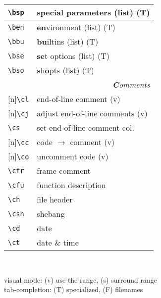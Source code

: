 \documentclass[oneside,11pt,landscape,DIV16]{scrartcl}
\newcommand{\Rep}{{\scriptsize{[n]}}}
\begin{document}
\begin{multicols}{3}
\begin{center}
\begin{tabular}[]{|p{11mm}|p{60mm}|}
\hline \verb'\bsp'   & \textbf{s}pecial \textbf{p}arameters (list)     \hfill (T)\\
\hline \verb'\ben'   & \textbf{en}vironment (list)                     \hfill (T)\\
\hline \verb'\bbu'   & \textbf{bu}iltins (list)                        \hfill (T)\\
\hline \verb'\bse'   & \textbf{se}t options (list)                     \hfill (T)\\
\hline \verb'\bso'   & \textbf{s}h\textbf{o}pts (list)                 \hfill (T)\\
\hline 
\hline
\multicolumn{2}{|r|}{\textsl{\textbf{C}omments}}                       \\[1.0ex]
\hline \Rep\verb'\cl'   & end-of-line comment               \hfill (v)\\
\hline \Rep\verb'\cj'   & adjust end-of-line comments       \hfill (v)\\
\hline     \verb'\cs'   & set end-of-line comment col.      \\
%
\hline \Rep\verb'\cc'   & code $\rightarrow$ comment        \hfill (v)\\
\hline \Rep\verb'\co'   & uncomment code                    \hfill (v)\\
%
\hline     \verb'\cfr'  & frame comment                     \\
\hline     \verb'\cfu'  & function description              \\
\hline     \verb'\ch'   & file header                       \\
\hline     \verb'\csh'  & shebang                           \\
\hline     \verb'\cd'   & date                              \\
\hline     \verb'\ct'   & date \& time                      \\
\hline
\end{tabular}\\[1.0ex]
%
%
\parbox[t][5mm][t]{0.33\textwidth}{%
\scriptsize%
visual mode: {\normalsize (v)} use the range, 
{\normalsize (s)} surround range \\
tab-completion: {\normalsize (T)} specialized,
{\normalsize (F)} filenames
}\\%
%

\end{center}
\end{multicols}
\end{document}
